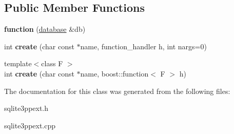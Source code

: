 \subsection*{Public Member Functions}
\begin{DoxyCompactItemize}
\item 
\hypertarget{classsqlite3pp_1_1ext_1_1function_ac4dce0f916f9f83366794d4124877044}{{\bfseries function} (\hyperlink{classsqlite3pp_1_1database}{database} \&db)}\label{classsqlite3pp_1_1ext_1_1function_ac4dce0f916f9f83366794d4124877044}

\item 
\hypertarget{classsqlite3pp_1_1ext_1_1function_ab01204cf5560b17a72830d48bbe0cbfe}{int {\bfseries create} (char const $\ast$name, function\-\_\-handler h, int nargs=0)}\label{classsqlite3pp_1_1ext_1_1function_ab01204cf5560b17a72830d48bbe0cbfe}

\item 
\hypertarget{classsqlite3pp_1_1ext_1_1function_add028483ddbb6bdd8a972099116b0bca}{{\footnotesize template$<$class F $>$ }\\int {\bfseries create} (char const $\ast$name, boost\-::function$<$ F $>$ h)}\label{classsqlite3pp_1_1ext_1_1function_add028483ddbb6bdd8a972099116b0bca}

\end{DoxyCompactItemize}


The documentation for this class was generated from the following files\-:\begin{DoxyCompactItemize}
\item 
sqlite3ppext.\-h\item 
sqlite3ppext.\-cpp\end{DoxyCompactItemize}
